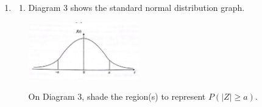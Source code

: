 \documentclass{report}
\newcommand{\sol}{\textbf{Solution:}}
\begin{document}
\begin{enumerate}[leftmargin=*]
              [Use $\pi=3.142$]
          \begin{enumerate}
              \item State the $\angle C O D$, in terms of $\pi$,

                    \sol{}
                    \begin{align*}
                        \angle C O D & = 360^\circ - 240^\circ \\
                                     & = 120^\circ
                    \end{align*}

              \item Hence, calculate the value of $h$ and of $k$ to the nearest integer.

                    \sol{}
                    \begin{align*}
                        \angle DOP                      & = \angle POC = \dfrac{120}{2} = 60^\circ = \dfrac{\pi}{3} \text{ radian} \\
                        \text{Perimeter of sector } AOB & = 2\pi h + 2k = 15.235 \text{ cm}                                        \\
                    \end{align*}
          \end{enumerate}

    \item \begin{enumerate}
              \item Diagram 3 shows the standard normal distribution graph.
                    \begin{center}
                        \includegraphics[width=0.4\textwidth]{./assets/p1.8a.png}
                    \end{center}
                    On Diagram 3, shade the region(s) to represent $P(|Z| \geq a)$.


\end{enumerate}
\end{enumerate}
\end{document}
